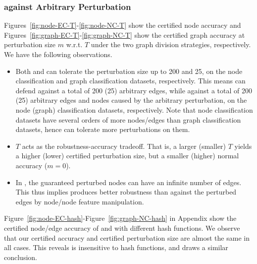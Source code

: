 \subsubsection{{\name} against Arbitrary Perturbation}

 Figures~\ref{fig:node-EC-T}-\ref{fig:node-NC-T} show the certified node accuracy and Figures~\ref{fig:graph-EC-T}-\ref{fig:graph-NC-T} show the certified graph accuracy at perturbation size $m$ w.r.t. $T$ under the two graph division strategies, respectively.
We have the following observations. 

\begin{itemize}[leftmargin=*]
\vspace{-2mm}
\item Both {\nameE} and {\nameN} can tolerate the perturbation size up to 200 and 25, on the node classification and graph classification datasets, respectively. This means {\nameE} can defend against a total of 200 (25) arbitrary edges, while {\nameN}  against a total of 200 (25) arbitrary edges and nodes caused by the arbitrary perturbation,  on the node (graph) classification datasets, respectively. 
Note that node classification datasets have several orders of more nodes/edges than graph classification datasets, hence {\name} can tolerate more perturbations on them.



\vspace{-2mm}
\item $T$ acts as the robustness-accuracy tradeoff. That is, a larger (smaller) $T$ yields a higher (lower) certified perturbation size, but a smaller (higher) normal accuracy ($m=0$). 

\vspace{-2mm}
\item In {\nameN}, the guaranteed perturbed nodes can 
have an infinite number of edges. This thus implies  {\nameN} produces better   robustness than {\nameE} against the perturbed  edges by node/node feature manipulation. 
\end{itemize}

\vspace{+0.05in}
Figure~\ref{fig:node-EC-hash}-Figure~\ref{fig:graph-NC-hash} in Appendix 
show the certified node/edge accuracy of {\nameE} and  {\nameN} with different hash functions. We observe that our certified accuracy and certified perturbation size are almost the same in all cases. This reveals  {\name} is insensitive to hash functions, and \cite{xia2024gnncert} draws a similar conclusion. 

